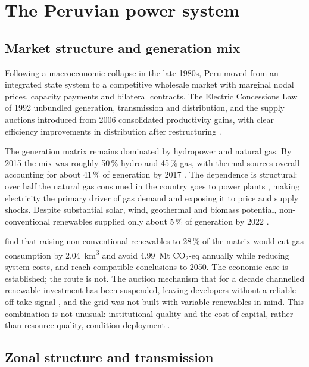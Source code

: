 \section{The Peruvian power system}
\label{sec:peru}

\subsection{Market structure and generation mix}
\label{sec:peru:overview}

Following a macroeconomic collapse in the late 1980s, Peru moved from an integrated
state system to a competitive wholesale market with marginal nodal prices, capacity
payments and bilateral contracts. The Electric Concessions Law of 1992 unbundled
generation, transmission and distribution, and the supply auctions introduced from
2006 consolidated productivity gains, with clear efficiency improvements in
distribution after restructuring \citep{rudnick2019,perezreyes2009}.

The generation matrix remains dominated by hydropower and natural gas. By 2015 the
mix was roughly 50\,\% hydro and 45\,\% gas, with thermal sources overall accounting
for about 41\,\% of generation by 2017 \citep{rudnick2019}. The dependence is
structural: over half the natural gas consumed in the country goes to power plants
\citep{enerdata2024}, making electricity the primary driver of gas demand and
exposing it to price and supply shocks. Despite substantial solar, wind, geothermal
and biomass potential, non-conventional renewables supplied only about 5\,\% of
generation by 2022 \citep{campodonico2022}.

\citet{fiestas2024} find that raising non-conventional renewables to 28\,\% of the
matrix would cut gas consumption by \SI{2.04}{\kilo\meter\cubed} and avoid
\SI{4.99}{\mega\tonne} CO$_2$-eq annually while reducing system costs, and
\citet{delacruz2024} reach compatible conclusions to 2050. The economic case is
established; the route is not. The auction mechanism that for a decade channelled
renewable investment has been suspended, leaving developers without a reliable off-take
signal \citep{campodonico2022,torres2026}, and the grid was not built with variable
renewables in mind. This combination is not unusual: institutional quality and the cost
of capital, rather than resource quality, condition deployment
\citep{boateng2026,delrio2026}.

\subsection{Zonal structure and transmission}
\label{sec:peru:zones}

